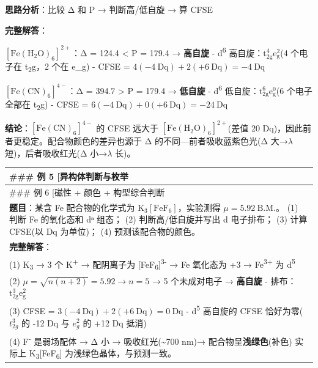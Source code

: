 \textbf{思路分析}：比较 Δ 和 P → 判断高/低自旋 → 算 CFSE

\textbf{完整解答}：

\textbf{\([\mathrm{Fe(H_2O)_6}]^{2+}\)}：Δ = 124.4 \textless{} P = 179.4 → \textbf{高自旋}
- d\textsuperscript{6} 高自旋：\(\mathrm{t_{2g}^4 e_g^2}\)(4 个电子在 t\textsubscript{2}g，2 个在 e\_g)
- CFSE = \(4(-4\ \mathrm{Dq}) + 2(+6\ \mathrm{Dq}) = -4\ \mathrm{Dq}\)

\textbf{\([\mathrm{Fe(CN)_6}]^{4-}\)}：Δ = 394.7 \textgreater{} P = 179.4 → \textbf{低自旋}
- d\textsuperscript{6} 低自旋：\(\mathrm{t_{2g}^6 e_g^0}\)(6 个电子全部在 t\textsubscript{2}g)
- CFSE = \(6(-4\ \mathrm{Dq}) + 0(+6\ \mathrm{Dq}) = -24\ \mathrm{Dq}\)

\textbf{结论}：\([\mathrm{Fe(CN)_6}]^{4-}\) 的 CFSE 远大于 \([\mathrm{Fe(H_2O)_6}]^{2+}\)(差值 20 Dq)，因此前者更稳定。配合物颜色的差异也源于 Δ 的不同---前者吸收蓝紫色光(Δ 大→\(\lambda\) 短)，后者吸收红光(Δ 小→\(\lambda\) 长)。

{\def\LTcaptype{none} %
\begin{longtable}[]{@{}
  >{\raggedright\arraybackslash}p{}@{}}
\toprule\noalign{}
\begin{minipage}[b]{\linewidth}\raggedright
\#\#\# 例 5 {[}异构体判断与枚举
\end{minipage} \\
\midrule\noalign{}
\endhead
\bottomrule\noalign{}
\endlastfoot
\#\#\# 例 6 {[}磁性 + 颜色 + 构型综合判断 \\
\textbf{题目}：某含 Fe 配合物的化学式为 \(\mathrm{K_3[FeF_6]}\)，实验测得 \(\mu = 5.92\ \mathrm{B.M.}\)。
(1) 判断 Fe 的氧化态和 dⁿ 组态；
(2) 判断高/低自旋并写出 d 电子排布；
(3) 计算 CFSE(以 Dq 为单位)；
(4) 预测该配合物的颜色。 \\
\textbf{完整解答}： \\
(1) K\textsubscript{3} → 3 个 K\textsuperscript{+} → 配阴离子为 {[}FeF\textsubscript{6}{]}\textsuperscript{3-} → Fe 氧化态为 +3 → Fe\textsuperscript{3+} 为 d\textsuperscript{5} \\
(2) \(\mu = \sqrt{n(n+2)} = 5.92 \rightarrow n = 5\) → 5 个未成对电子 → \textbf{高自旋}
- 排布：\(\mathrm{t_{2g}^3 e_g^2}\) \\
(3) CFSE = \(3(-4\ \mathrm{Dq}) + 2(+6\ \mathrm{Dq}) = 0\ \mathrm{Dq}\)
- d\textsuperscript{5} 高自旋的 CFSE 恰好为零(\(t_{2g}^3\) 的 -12 Dq 与 \(e_g^2\) 的 +12 Dq 抵消) \\
(4) F\textsuperscript{-} 是弱场配体 → Δ 小 → 吸收红光(\textasciitilde700 nm)→ 配合物呈\textbf{浅绿色}(补色)
实际上 K\textsubscript{3}{[}FeF\textsubscript{6}{]} 为浅绿色晶体，与预测一致。 \\
\end{longtable}
}

